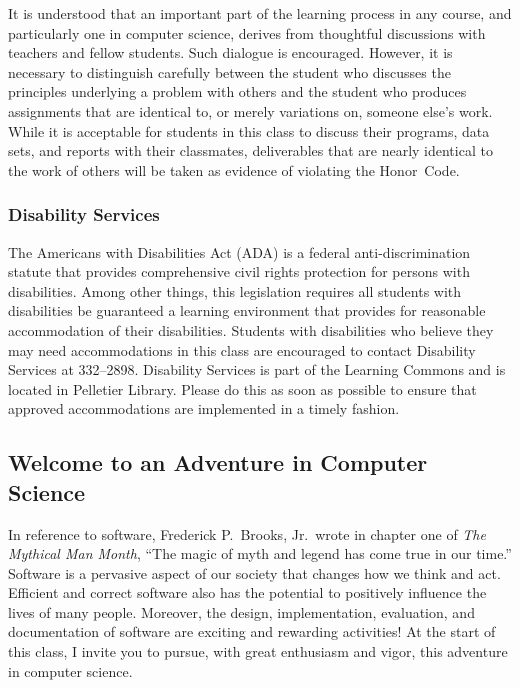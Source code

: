 \documentclass[11pt]{article}
\begin{document}
\noindent It is understood that an important part of the learning process in any course, and particularly one in
computer science, derives from thoughtful discussions with teachers and fellow students.  Such dialogue is encouraged.
However, it is necessary to distinguish carefully between the student who discusses the principles underlying a problem
with others and the student who produces assignments that are identical to, or merely variations on, someone else's
work.  While it is acceptable for students in this class to discuss their programs, data sets, and reports with their
classmates, deliverables that are nearly identical to the work of others will be taken as evidence of violating the
\mbox{Honor Code}.

\subsubsection*{Disability Services}

The Americans with Disabilities Act (ADA) is a federal anti-discrimination statute that provides comprehensive civil
rights protection for persons with disabilities.  Among other things, this legislation requires all students with
disabilities be guaranteed a learning environment that provides for reasonable accommodation of their disabilities.
Students with disabilities who believe they may need accommodations in this class are encouraged to contact Disability
Services at 332--2898.  Disability Services is part of the Learning Commons and is located in Pelletier Library.
Please do this as soon as possible to ensure that approved accommodations are implemented in a timely fashion.

\subsection*{Welcome to an Adventure in Computer Science}

In reference to software, Frederick P.\ Brooks, Jr.\ wrote in chapter one of {\em The Mythical Man Month}, ``The magic
of myth and legend has come true in our time.'' Software is a pervasive aspect of our society that changes how we think
and act.  Efficient and correct software also has the potential to positively influence the lives of many people.
Moreover, the design, implementation, evaluation, and documentation of software are exciting and rewarding activities!
At the start of this class, I invite you to pursue, with great enthusiasm and vigor, this adventure in computer science.
\end{document}

